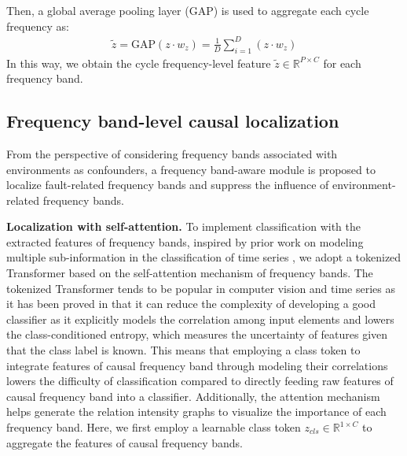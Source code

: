 \documentclass{article}
\begin{document}
	Then, a global average pooling layer (GAP) is used to aggregate each cycle frequency as:
	\begin{equation}
		\begin{aligned}
			\tilde{z} = \mathrm{GAP}\left(z \cdot w_{z}\right) = \frac{1}{D}\sum_{i=1}^{D} \left(z \cdot w_{z}\right)
		\end{aligned}
	\end{equation}
	In this way, we obtain the cycle frequency-level feature $\tilde{z}\in\mathbb{R}^{P\times C}$ for each frequency band.
	
	\subsection{Frequency band-level causal localization}
	From the perspective of considering frequency bands associated with environments as confounders, a frequency band-aware module is proposed to localize fault-related frequency bands and suppress the influence of environment-related frequency bands.
	
	\textbf{Localization with self-attention.} To implement classification with the extracted features of frequency bands, inspired by prior work on modeling multiple sub-information in the classification of time series \cite{RN14}, we adopt a tokenized Transformer based on the self-attention mechanism of frequency bands. The tokenized Transformer tends to be popular in computer vision and time series as it has been proved in \cite{RN14} that it can reduce the complexity of developing a good classifier as it explicitly models the correlation among input elements and lowers the class-conditioned entropy, which measures the uncertainty of features given that the class label is known. This means that employing a class token to integrate features of causal frequency band through modeling their correlations lowers the difficulty of classification compared to directly feeding raw features of causal frequency band into a classifier. Additionally, the attention mechanism helps generate the relation intensity graphs to visualize the importance of each frequency band. Here, we first employ a learnable class token $z_{cls}\in\mathbb{R}^{1\times C}$ to aggregate the features of causal frequency bands.
	
\end{document}
